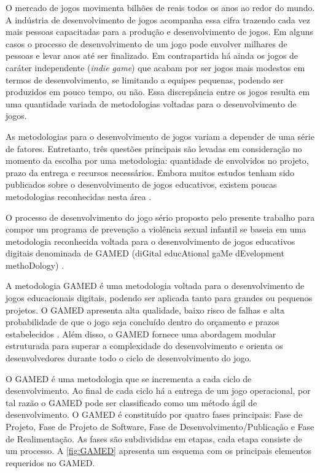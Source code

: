 O mercado de jogos movimenta bilhões de reais todos os anos ao redor do mundo. A indústria de desenvolvimento de jogos acompanha essa cifra trazendo cada vez mais pessoas capacitadas para a produção e desenvolvimento de jogos. Em alguns casos o processo de desenvolvimento de um jogo pode envolver milhares de pessoas e levar anos até ser finalizado. Em contrapartida há ainda os jogos de caráter independente (\textit{indie game}) que acabam por ser jogos mais modestos em termos de desenvolvimento, se limitando a equipes pequenas, podendo ser produzidos em pouco tempo, ou não. Essa discrepância entre os jogos resulta em uma quantidade variada de metodologias voltadas para o desenvolvimento de jogos.


As metodologias para o desenvolvimento de jogos variam a depender de uma série de fatores. Entretanto, três questões principais são levadas em consideração no momento da escolha por uma metodologia: quantidade de envolvidos no projeto, prazo da entrega e recursos necessários. Embora muitos estudos tenham sido publicados sobre o desenvolvimento de jogos educativos, existem poucas metodologias reconhecidas nesta área \cite{aslan2015gamed}. 

O processo de desenvolvimento do jogo sério proposto pelo presente trabalho para compor um programa de prevenção a violência sexual infantil se baseia em uma metodologia reconhecida voltada para o desenvolvimento de jogos educativos digitais denominada de GAMED (diGital educAtional gaMe dEvelopment methoDology) \cite{aslan2016digital}. 


A metodologia GAMED é uma metodologia voltada para o desenvolvimento de jogos educacionais digitais, podendo ser aplicada tanto para grandes ou pequenos projetos. O GAMED apresenta alta qualidade, baixo risco de falhas e alta probabilidade de que o jogo seja concluído dentro do orçamento e prazos estabelecidos \cite{aslan2015gamed}. Além disso, o GAMED fornece uma abordagem modular estruturada para superar a complexidade do desenvolvimento e orienta os desenvolvedores durante todo o ciclo de desenvolvimento do jogo.


O GAMED é uma metodologia que se incrementa a cada ciclo de desenvolvimento. Ao final de cada ciclo há a entrega de um jogo operacional, por tal razão o GAMED pode ser classificado como um método ágil de desenvolvimento. O GAMED é constituído por quatro fases principais: Fase de Projeto, Fase de Projeto de Software, Fase de Desenvolvimento/Publicação e Fase de Realimentação. As fases são subdivididas em etapas, cada etapa consiste de um processo. A \autoref{fig:GAMED} apresenta um esquema com os principais elementos requeridos no GAMED. 

